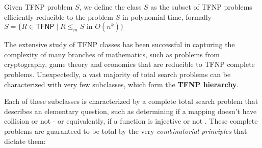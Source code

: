 \begin{definition}
 Given \textsf{TFNP} problem $S$, we define the class $S$ as the subset of \textsf{TFNP} problems efficiently reducible to the problem $S$ in polynomial time, formally $S = \{R \in \mathsf{TFNP} \mid R \leq_m S \text{ in } O(n^k)\}$
\end{definition}

The extensive study of \textsf{TFNP} classes has been successful in capturing the complexity of many branches of mathematics, such as problems from cryptography, game theory and economics that are reducible to TFNP complete problems. Unexpectedly, a vast majority of total search problems can be characterized with very few subclasses, which form the \textbf{\textsf{TFNP} hierarchy}. 

\newpage

Each of these subclasses is characterized by a complete total search problem that describes an elementary question, such as determining if a mapping doesn't have collision or not - or equivalently, if a function is injective or not \cite{proofs_circuits_communication,tfnp_characterization}. These complete problems are guaranteed to be total by the very \textit{combinatorial principles} that dictate them:

